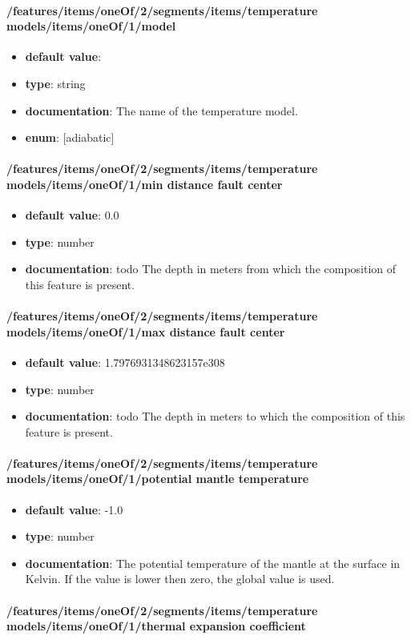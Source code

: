 \paragraph{/features/items/oneOf/2/segments/items/temperature models/items/oneOf/1/model}
\begin{itemize}\item {\bf default value}: 
\item {\bf type}: string
\item {\bf documentation}: The name of the temperature model.
\item {\bf enum}: [adiabatic]\end{itemize}\paragraph{/features/items/oneOf/2/segments/items/temperature models/items/oneOf/1/min distance fault center}
\begin{itemize}\item {\bf default value}: 0.0
\item {\bf type}: number
\item {\bf documentation}: todo The depth in meters from which the composition of this feature is present.
\end{itemize}\paragraph{/features/items/oneOf/2/segments/items/temperature models/items/oneOf/1/max distance fault center}
\begin{itemize}\item {\bf default value}: 1.7976931348623157e308
\item {\bf type}: number
\item {\bf documentation}: todo The depth in meters to which the composition of this feature is present.
\end{itemize}\paragraph{/features/items/oneOf/2/segments/items/temperature models/items/oneOf/1/potential mantle temperature}
\begin{itemize}\item {\bf default value}: -1.0
\item {\bf type}: number
\item {\bf documentation}: The potential temperature of the mantle at the surface in Kelvin. If the value is lower then zero, the global value is used.
\end{itemize}\paragraph{/features/items/oneOf/2/segments/items/temperature models/items/oneOf/1/thermal expansion coefficient}
